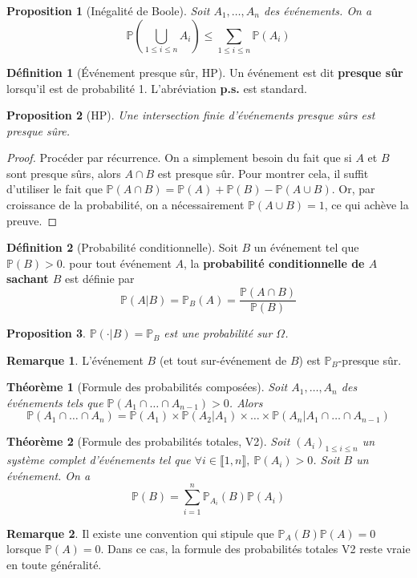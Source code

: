 \documentclass[french]{book}
\renewcommand{\P}{\mathbb{P}}
\theoremstyle{plain}
\newtheorem{thm}{Théorème}[chapter]
\newtheorem{prop}{Proposition}[chapter]
\theoremstyle{definition}
\newtheorem{dfn}{Définition}[chapter]
\newtheorem{rmq}{Remarque}[chapter]
\theoremstyle{remark}
\begin{document}
\begin{prop}[Inégalité de Boole]
	Soit $A_1,\ldots,A_n$ des événements. On a $$\P\left(\bigcup_{1\leqslant i\leqslant n}A_i\right)\leqslant\sum_{1\leqslant i\leqslant n}\P(A_i)$$
\end{prop}
\begin{dfn}[Événement presque sûr, HP]
	Un événement est dit \textbf{presque sûr} lorsqu'il est de probabilité 1. L'abréviation \textbf{p.s.} est standard.
\end{dfn}
\begin{prop}[HP]
	Une intersection finie d'événements presque sûrs est presque sûre.
\end{prop}
\begin{proof}
	Procéder par récurrence. On a simplement besoin du fait que si $A$ et $B$ sont presque sûrs, alors $A\cap B$ est presque sûr. Pour montrer cela, il suffit d'utiliser le fait que $\P(A\cap B)=\P(A)+\P(B)-\P(A\cup B)$. Or, par croissance de la probabilité, on a nécessairement $\P(A\cup B)=1$, ce qui achève la preuve.
\end{proof}
\begin{dfn}[Probabilité conditionnelle]
	Soit $B$ un événement tel que $\P(B)>0$. pour tout événement $A$, la \textbf{probabilité conditionnelle de $A$ sachant $B$} est définie par $$\P(A|B)=\P_B(A)=\frac{\P(A\cap B)}{\P(B)}$$
\end{dfn}
\begin{prop}
	$\P(\cdot| B)=\P_B$ est une probabilité sur $\Omega$.
\end{prop}
\begin{rmq} L'événement $B$ (et tout sur-événement de $B$) est $\P_B$-presque sûr. \end{rmq}
\begin{thm}[Formule des probabilités composées]
	Soit $A_1,\ldots,A_n$ des événements tels que $\P(A_1\cap\ldots\cap A_{n-1})>0$. Alors $$\P(A_1\cap\ldots\cap A_n)=\P(A_1)\times \P(A_2|A_1)\times\ldots\times \P(A_n|A_1\cap\ldots\cap A_{n-1})$$
\end{thm}
\begin{thm}[Formule des probabilités totales, V2]
	Soit $(A_i)_{1\leqslant i\leqslant n}$ un système complet d'événements tel que $\forall i \in\llbracket1,n\rrbracket, \ \P(A_i)>0$. Soit $B$ un événement. On a $$\P(B)=\sum_{i=1}^{n}\P_{A_i}(B)\P(A_i)$$
\end{thm}
\begin{rmq} Il existe une convention qui stipule que $\P_A(B)\P(A)=0$ lorsque $\P(A)=0$. Dans ce cas, la formule des probabilités totales V2 reste vraie en toute généralité. \end{rmq}
\end{document}
